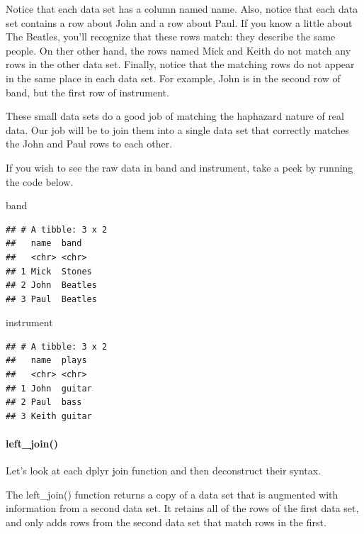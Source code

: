 \documentclass[
]{article}
\newenvironment{Shaded}{\begin{snugshade}}{\end{snugshade}}
\newcommand{\NormalTok}[1]{#1}
\begin{document}
Notice that each data set has a column named name. Also, notice that
each data set contains a row about John and a row about Paul. If you
know a little about The Beatles, you'll recognize that these rows match:
they describe the same people. On ther other hand, the rows named Mick
and Keith do not match any rows in the other data set. Finally, notice
that the matching rows do not appear in the same place in each data set.
For example, John is in the second row of band, but the first row of
instrument.

These small data sets do a good job of matching the haphazard nature of
real data. Our job will be to join them into a single data set that
correctly matches the John and Paul rows to each other.

If you wish to see the raw data in band and instrument, take a peek by
running the code below.

\begin{Shaded}
\begin{Highlighting}[]
\NormalTok{band}
\end{Highlighting}
\end{Shaded}

\begin{verbatim}
## # A tibble: 3 x 2
##   name  band   
##   <chr> <chr>  
## 1 Mick  Stones 
## 2 John  Beatles
## 3 Paul  Beatles
\end{verbatim}

\begin{Shaded}
\begin{Highlighting}[]
\NormalTok{instrument}
\end{Highlighting}
\end{Shaded}

\begin{verbatim}
## # A tibble: 3 x 2
##   name  plays 
##   <chr> <chr> 
## 1 John  guitar
## 2 Paul  bass  
## 3 Keith guitar
\end{verbatim}

\hypertarget{left_join}{%
\paragraph{left\_join()}\label{left_join}}

Let's look at each dplyr join function and then deconstruct their
syntax.

The left\_join() function returns a copy of a data set that is augmented
with information from a second data set. It retains all of the rows of
the first data set, and only adds rows from the second data set that
match rows in the first.
\end{document}
